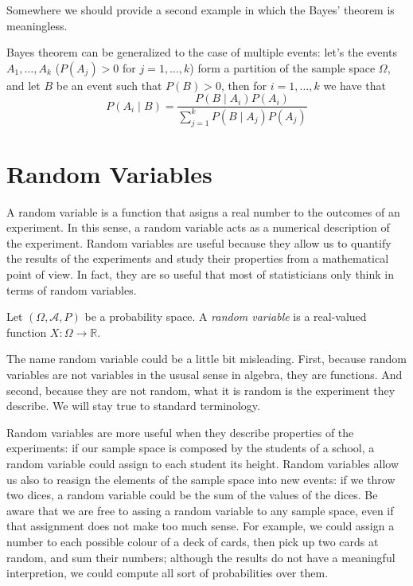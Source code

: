 {\color{red} Somewhere we should provide a second example in which the Bayes' theorem is meaningless.}

Bayes theorem can be generalized to the case of multiple events: let's the events $A_{1}, \ldots, A_{k}$ ($P\left( A_{j} \right)>0$ for $j=1, \ldots, k$) form a partition of the sample space $\Omega$, and let $B$ be an event such that $P\left(B\right)>0$, then for $i=1, \ldots, k$ we have that
\[
P\left(A_{i}\mid B\right)=\frac{P\left(B\mid A_{i}\right) P\left(A_{i}\right)}{\sum_{j=1}^{k} P\left(B \mid A_{j}\right) P\left(A_{j}\right)}
\]

%
%

\section{Random Variables}
\label{sec:probability_random_variables}

A random variable is a function that asigns a real number to the outcomes of an experiment. In this sense, a random variable acts as a numerical description of the experiment. Random variables are useful because they allow us to quantify the results of the experiments and study their properties from a mathematical point of view. In fact, they are so useful that most of statisticians only think in terms of random variables.

\begin{definition}
Let $\left( \Omega, \mathcal{A} , P \right)$ be a probability space. A \emph{random variable} is a real-valued function $X : \Omega \rightarrow \mathbb{R}$.
\end{definition}

The name random variable could be a little bit misleading. First, because random variables are not variables in the ususal sense in algebra, they are functions. And second, because they are not random, what it is random is the experiment they describe. We will stay true to standard terminology.

Random variables are more useful when they describe properties of the experiments: if our sample space is composed by the students of a school, a random variable could assign to each student its height. Random variables allow us also to reasign the elements of the sample space into new events: if we throw two dices, a random variable could be the sum of the values of the dices. Be aware that we are free to assing a random variable to any sample space, even if that assignment does not make too much sense. For example, we could assign a number to each possible colour of a deck of cards, then pick up two cards at random, and sum their numbers; although the results do not have a meaningful interpretion, we could compute all sort of probabilities over them.

